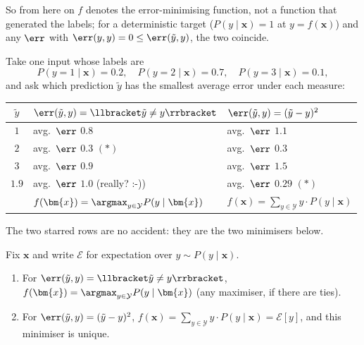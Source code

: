 So from here on \(f\) denotes the error-minimising function, not a function
that generated the labels; for a deterministic target (\(P(y \mid \bm{x}) =
1\) at \(y = f(\bm{x})\)) and any \(\err\) with \(\err(y, y) = 0 \le
\err(\tilde{y}, y)\), the two coincide.

Take one input whose labels are
\[
    P(y = 1 \mid \bm{x}) = 0.2, \quad P(y = 2 \mid \bm{x}) = 0.7, \quad
    P(y = 3 \mid \bm{x}) = 0.1 ,
\]
and ask which prediction \(\tilde{y}\) has the smallest average error under
each measure:

\begin{center}
    \solidrules
    \begin{tabular}{@{}c|l|l@{}}
        \toprule
        \(\tilde{y}\) & \(\err(\tilde{y}, y) = \llbracket \tilde{y} \neq y
        \rrbracket\) & \(\err(\tilde{y}, y) = (\tilde{y} - y)^2\)\\
        \midrule
        \(1\) & avg.\ \(\err\) \(0.8\) & avg.\ \(\err\) \(1.1\)\\
        \(2\) & avg.\ \(\err\) \(0.3\) \((*)\) & avg.\ \(\err\) \(0.3\)\\
        \(3\) & avg.\ \(\err\) \(0.9\) & avg.\ \(\err\) \(1.5\)\\
        \(1.9\) & avg.\ \(\err\) \(1.0\) (\textcolor{orange!85!black}{really?
        :-)}) & avg.\ \(\err\) \(0.29\) \((*)\)\\
        \midrule
        & \cellcolor{vcregion}\(f(\bm{x}) = \displaystyle\argmax_{y \in
        \mathcal{Y}} P(y \mid \bm{x})\)
        & \cellcolor{vcregion}\(f(\bm{x}) = \displaystyle\sum_{y \in
        \mathcal{Y}} y \cdot P(y \mid \bm{x})\)\\
        \bottomrule
    \end{tabular}
\end{center}

The two starred rows are no accident: they are the two minimisers below.

\begin{proposition}
    \label{prop:mini-target}
    Fix \(\bm{x}\) and write \(\mathcal{E}\) for expectation over \(y \sim
    P(y \mid \bm{x})\).
    \begin{enumerate}
        \item For \(\err(\tilde{y}, y) = \llbracket \tilde{y} \neq y
            \rrbracket\), \(f(\bm{x}) = \argmax_{y \in \mathcal{Y}} P(y \mid
            \bm{x})\) (any maximiser, if there are ties).
        \item For \(\err(\tilde{y}, y) = (\tilde{y} - y)^2\), \(f(\bm{x}) =
            \sum_{y \in \mathcal{Y}} y \cdot P(y \mid \bm{x}) = \mathcal{E}[y]\),
            and this minimiser is unique.
    \end{enumerate}
\end{proposition}

